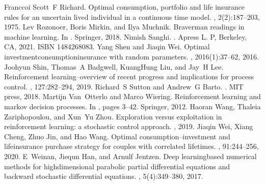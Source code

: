 \documentclass[letterpaper,10pt,english]{jupyterBook}
\begin{document}
\begin{sphinxthebibliography}{Franccoi}
\sphinxAtStartPar
Scott F Richard. Optimal consumption, portfolio and life insurance rules for an uncertain lived individual in a continuous time model. , 2(2):187–203, 1975.
\sphinxAtStartPar
Lev Rozonoer, Boris Mirkin, and Ilya Muchnik. Braverman readings in machine learning. In . Springer, 2018.
\sphinxAtStartPar
Nimish Sanghi. . Apress L. P, Berkeley, CA, 2021. ISBN 1484268083.
\sphinxAtStartPar
Yang Shen and Jiaqin Wei. Optimal investment\sphinxhyphen{}consumption\sphinxhyphen{}insurance with random parameters. , 2016(1):37–62, 2016.
\sphinxAtStartPar
Joohyun Shin, Thomas A Badgwell, Kuang\sphinxhyphen{}Hung Liu, and Jay H Lee. Reinforcement learning–overview of recent progress and implications for process control. , 127:282–294, 2019.
\sphinxAtStartPar
Richard S Sutton and Andrew G Barto. . MIT press, 2018.
\sphinxAtStartPar
Martijn Van Otterlo and Marco Wiering. Reinforcement learning and markov decision processes. In , pages 3–42. Springer, 2012.
\sphinxAtStartPar
Haoran Wang, Thaleia Zariphopoulou, and Xun Yu Zhou. Exploration versus exploitation in reinforcement learning: a stochastic control approach. , 2019.
\sphinxAtStartPar
Jiaqin Wei, Xiang Cheng, Zhuo Jin, and Hao Wang. Optimal consumption–investment and life\sphinxhyphen{}insurance purchase strategy for couples with correlated lifetimes. , 91:244–256, 2020.
\sphinxAtStartPar
E Weinan, Jiequn Han, and Arnulf Jentzen. Deep learning\sphinxhyphen{}based numerical methods for high\sphinxhyphen{}dimensional parabolic partial differential equations and backward stochastic differential equations. , 5(4):349–380, 2017.

\end{sphinxthebibliography}
\end{document}
